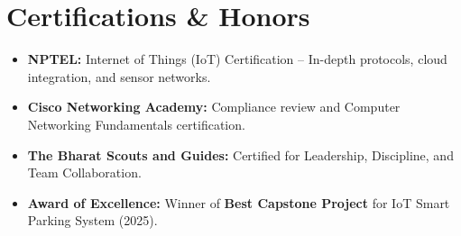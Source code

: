 \documentclass[a4paper,10pt]{article}
\begin{document}
\section{Certifications \& Honors}
\begin{itemize}
    \item \textbf{NPTEL:} Internet of Things (IoT) Certification -- In-depth protocols, cloud integration, and sensor networks.
    \item \textbf{Cisco Networking Academy:} Compliance review and Computer Networking Fundamentals certification.
    \item \textbf{The Bharat Scouts and Guides:} Certified for Leadership, Discipline, and Team Collaboration.
    \item \textbf{Award of Excellence:} Winner of \textbf{Best Capstone Project} for IoT Smart Parking System (2025).
\end{itemize}
\end{document}
